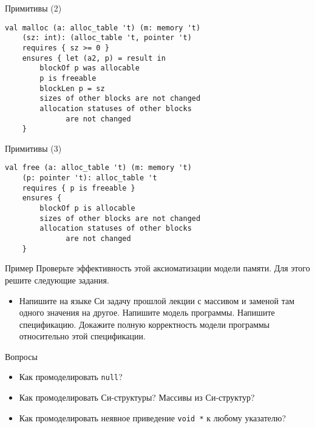 \documentclass[hyperref={unicode=true}]{beamer}
\begin{document}
    \begin{frame}[fragile]{Примитивы (2)}
    \begin{lstlisting}
val malloc (a: alloc_table 't) (m: memory 't)
    (sz: int): (alloc_table 't, pointer 't)
    requires { sz >= 0 }
    ensures { let (a2, p) = result in
        blockOf p was allocable
        p is freeable
        blockLen p = sz
        sizes of other blocks are not changed
        allocation statuses of other blocks
              are not changed
    }
    \end{lstlisting}
    \end{frame}

    \begin{frame}[fragile]{Примитивы (3)}
    \begin{lstlisting}
val free (a: alloc_table 't) (m: memory 't)
    (p: pointer 't): alloc_table 't
    requires { p is freeable }
    ensures {
        blockOf p is allocable
        sizes of other blocks are not changed
        allocation statuses of other blocks
              are not changed
    }
    \end{lstlisting}
    \end{frame}

    \begin{frame}{Пример}
    Проверьте эффективность этой аксиоматизации
    модели памяти. Для этого решите следующие задания.
    \begin{itemize}
    \item Напишите на языке Си задачу прошлой лекции
    с массивом и заменой там одного значения на другое.
    Напишите модель программы. Напишите спецификацию.
    Докажите полную корректность модели программы
    относительно этой спецификации.
    \end{itemize}
    \end{frame}

    \begin{frame}{Вопросы}
    \begin{itemize}
    \item Как промоделировать \texttt{null}?
    \item Как промоделировать Си-структуры? Массивы
    из Си-структур?
    \item Как промоделировать неявное приведение
    \texttt{void *} к любому указателю?
    \end{itemize}
    \end{frame}
\end{document}
